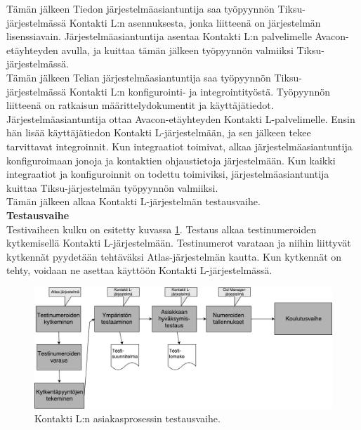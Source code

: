 \documentclass[finnish,12pt,a4paper,pdftex]{article}
\begin{document}
\noindent Tämän jälkeen Tiedon järjestelmäasiantuntija saa työpyynnön Tiksu-järjestelmässä Kontakti L:n asennuksesta, jonka liitteenä on järjestelmän lisenssiavain. Järjestelmäasiantuntija asentaa Kontakti L:n palvelimelle Avacon-etäyhteyden avulla, ja kuittaa tämän jälkeen työpyynnön valmiiksi Tiksu-järjestelmässä.\\

\noindent Tämän jälkeen Telian järjestelmäasiantuntija saa työpyynnön Tiksu-järjestelmässä Kontakti L:n konfigurointi- ja integrointityöstä. Työpyynnön liitteenä on ratkaisun määrittelydokumentit ja käyttäjätiedot. Järjestelmäasiantuntija ottaa Avacon-etäyhteyden Kontakti L-palvelimelle. Ensin hän lisää käyttäjätiedon Kontakti L-järjestelmään, ja sen jälkeen tekee tarvittavat integroinnit. Kun integraatiot toimivat, alkaa järjestelmäasiantuntija konfiguroimaan jonoja ja kontaktien ohjaustietoja järjestelmään. Kun kaikki integraatiot ja konfiguroinnit on todettu toimiviksi, järjestelmäasiantuntija kuittaa Tiksu-järjestelmän työpyynnön valmiiksi.\\

Tämän jälkeen alkaa Kontakti L-järjestelmän testausvaihe.\\

\textbf{Testausvaihe}\\


\noindent Testivaiheen kulku on esitetty kuvassa \ref{fig:testaus}. Testaus alkaa testinumeroiden kytkemisellä Kontakti L-järjestelmään. Testinumerot varataan ja niihin liittyvät kytkennät pyydetään tehtäväksi Atlas-järjestelmän kautta. Kun kytkennät on tehty, voidaan ne asettaa käyttöön Kontakti L-järjestelmässä. \\

\begin{figure}[!h]
    \centering
    \includegraphics[scale=0.3]{images/Testaus.pdf}
    \caption{Kontakti L:n asiakasprosessin testausvaihe.}
    \label{fig:testaus}
\end{figure}
\end{document}
